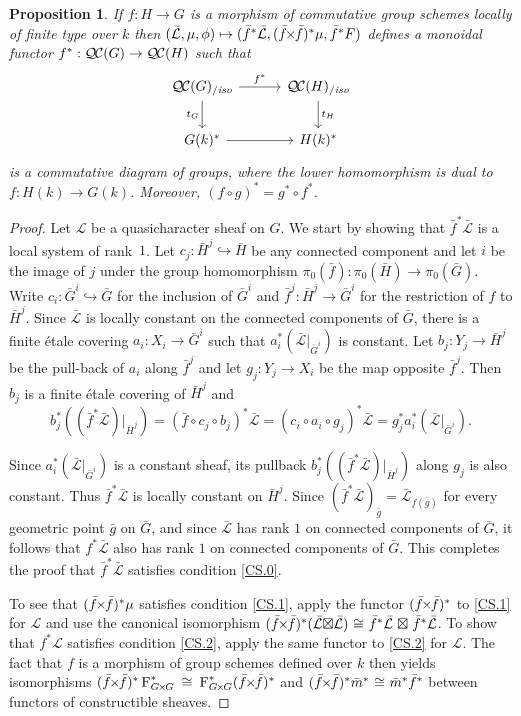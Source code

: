 \documentclass[11pt]{amsart}
\theoremstyle{plain}
\newtheorem{proposition}[theorem]{Proposition}
\theoremstyle{definition}
\theoremstyle{remark}
\newcommand{\Fq}{k}
\newcommand{\Frob}[1]{\operatorname{F}_{#1}}
\newcommand{\iso}{{\ \cong\ }}
\newcommand{\qcs}[1]{{\mathcal{#1}}}
\newcommand{\gqcs}[1]{{\mathcal{\bar #1}}}
\newcommand{\QC}{{\mathcal{Q\hskip-0.8pt C}}}
\newcommand{\QCiso}[1]{\QC(#1)_{/\textit{iso}}}
\newcommand{\trFrob}[1]{t_{#1}}
\renewcommand{\bf}{\bar{f}}
\newcommand{\bg}{\bar{g}}
\newcommand{\bm}{\bar{m}}
\newcommand{\bG}{\bar{G}}
\newcommand{\bH}{\bar{H}}
\newcommand{\tight}[3]{\hspace{-#1pt}{#2}\hspace{-#3pt}}
\newcommand{\bfxf}{\text{$\bar{f} \tight{1}{\times}{1} \bar{f}$}}
\newcommand{\GxxG}{\text{$G \tight{1}{\times}{1} G$}}
\newcommand{\LxL}{\text{$\gqcs{L} \tight{0}{\boxtimes}{0} \gqcs{L}$}}
\begin{document}
\begin{proposition}\label{prop:pullback}
  If $f : H\to G$ is a morphism of commutative group schemes locally of finite type over $\Fq$ then
  $(\gqcs{L},\mu,\phi) \mapsto (\bf^*\gqcs{L},(\bfxf)^*\mu,\bf^*F)$
  defines a monoidal functor $f^* : \QC(G) \to \QC(H)$ such that
  \[
  \begin{tikzcd}[row sep=20, column sep=30]
   \QCiso{G} \rar{f^*} \arrow[swap]{d}{\trFrob{G}} & \QCiso{H} \dar{\trFrob{H}} \\
   G(\Fq)^* \rar & H(\Fq)^*
  \end{tikzcd}
  \]
  is a commutative diagram of groups, where the lower homomorphism is
  dual to $f : H(\Fq)\to G(\Fq)$.  Moreover, $(f\circ g)^* = g^* \circ f^*$.
\end{proposition}

\begin{proof}
  Let $\qcs{L}$ be a quasicharacter sheaf on $G$. We start by showing that
  $\bf^*\gqcs{L}$ is a local system of rank~$1$. Let $c_j :\bH^j \hookrightarrow \bH$ be any
  connected component and let $i$ be the image of $j$ under the group
  homomorphism $\pi_0(\bf) : \pi_0(\bH) \to \pi_0(\bG)$.
  Write $c_i : \bG^i \hookrightarrow \bG$ for
  the inclusion of $\bG^i$ and $\bf^j : \bH^j \to \bG^i$
  for the restriction of $f$ to $\bH^j$.  Since $\gqcs{L}$ is locally constant on the connected
  components of $\bG$, there is a finite \'etale covering
  $a_i : X_i \to \bG^i$ such that $a_i^* (\gqcs{L}\vert_{\bG^i})$
  is constant. Let $b_j : Y_j \to \bH^j$ be the
  pull-back of $a_i$ along $\bf^j$ and let $g_j : Y_j \to X_i$ be
  the map opposite $\bf^j$. Then $b_j$ is a finite \'etale covering
  of $\bH^j$ and
  \[
  b_j^* \left( (\bf^* \gqcs{L})\vert_{\bH^j}\right)
  = (\bf\circ c_j \circ b_j)^*\gqcs{L}
  = (c_i\circ a_i\circ g_j)^*\gqcs{L} = g_j^* a_i^* (\gqcs{L}\vert_{\bG^i}).
  \]

  Since $a_i^* (\gqcs{L}\vert_{\bG^i})$ is a constant sheaf, its pullback
  $b_j^* \left( (\bf^*\gqcs{L})\vert_{\bH^j}\right)$ along $g_j$ is also constant.
  Thus $\bf^*\gqcs{L}$ is locally constant on
  $\bH^j$. Since $(\bf^*\gqcs{L})_{\bg} = \gqcs{L}_{f(\bg)}$ for every
  geometric point ${\bg}$ on $\bG$, and since $\gqcs{L}$ has
  rank $1$ on connected components of $\bG$, it follows that
  $f^*\gqcs{L}$ also has rank $1$ on connected components of $\bG$.
  This completes the proof that $\bf^*\gqcs{L}$ satisfies condition \ref{CS.0}.

  To see that $(\bfxf)^* \mu$ satisfies
  condition \ref{CS.1}, apply the functor $(\bfxf)^*$
  to \ref{CS.1} for $\qcs{L}$ and use the canonical isomorphism
  $(\bfxf)^*(\LxL) \iso \bf^*\gqcs{L} \tight{-3}{\boxtimes}{-3} \bf^*\gqcs{L}$.
  To show that $f^*\qcs{L}$ satisfies condition
  \ref{CS.2}, apply the same functor to \ref{CS.2} for $\qcs{L}$.
  The fact that $f$ is a morphism of group schemes defined over $\Fq$ then
  yields isomorphisms $(\bfxf)^*\Frob{\GxxG}^* \iso \Frob{\GxxG}^* (\bfxf)^*$
  and $(\bfxf)^* \bm^*\iso \bm^* \bf^*$ between functors of constructible sheaves.
  

\end{proof}
\end{document}
